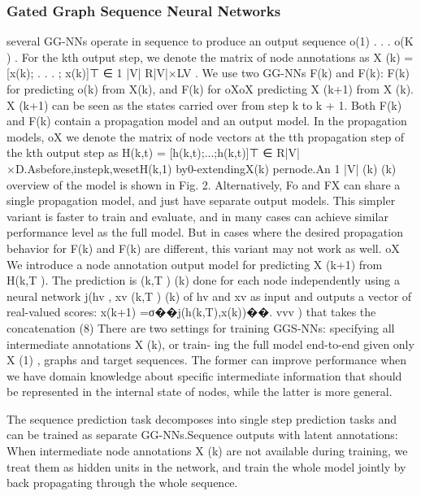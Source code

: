 \documentclass{article}
\begin{document}
\subsubsection{Gated Graph Sequence Neural Networks}
several GG-NNs operate in sequence to produce an output sequence o(1) . . . o(K ) .
For the kth output step, we denote the matrix of node annotations as X (k) = [x(k); . . . ; x(k)]⊤ ∈ 1 |V|
R|V|×LV . We use two GG-NNs F(k) and F(k): F(k) for predicting o(k) from X(k), and F(k) for oXoX
predicting X (k+1) from X (k). X (k+1) can be seen as the states carried over from step k to k + 1. Both F(k) and F(k) contain a propagation model and an output model. In the propagation models,
oX
we denote the matrix of node vectors at the tth propagation step of the kth output step as H(k,t) =
[h(k,t);...;h(k,t)]⊤ ∈ R|V|×D.Asbefore,instepk,wesetH(k,1) by0-extendingX(k) pernode.An 1 |V| (k) (k)
overview of the model is shown in Fig. 2. Alternatively, Fo and FX can share a single propagation model, and just have separate output models. This simpler variant is faster to train and evaluate, and in many cases can achieve similar performance level as the full model. But in cases where the desired propagation behavior for F(k) and F(k) are different, this variant may not work as well.
oX
We introduce a node annotation output model for predicting X (k+1) from H(k,T ). The prediction is
(k,T ) (k) done for each node independently using a neural network j(hv , xv
(k,T ) (k)
of hv and xv as input and outputs a vector of real-valued scores:
x(k+1) =σ��j(h(k,T),x(k))��. vvv
) that takes the concatenation (8)
There are two settings for training GGS-NNs: specifying all intermediate annotations X (k), or train- ing the full model end-to-end given only X (1) , graphs and target sequences. The former can improve performance when we have domain knowledge about specific intermediate information that should be represented in the internal state of nodes, while the latter is more general.

The sequence prediction task decomposes into single step prediction tasks and can be trained as separate GG-NNs.Sequence outputs with latent annotations: When intermediate node annotations X (k) are not available during training, we treat them as hidden units in the network, and train the whole model jointly by back propagating through the whole sequence.
\end{document}
